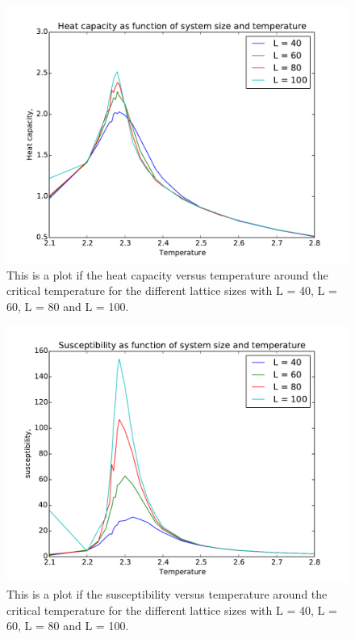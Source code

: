 \begin{figure}[H]
\includegraphics[width=\linewidth]{../results/4e/4e_Cv}\caption{This is a plot if the heat capacity versus temperature around the critical temperature for the different lattice sizes with L = 40, L = 60, L = 80 and L = 100.}\label{fig:4e_heat_capa}
\end{figure}

\begin{figure}[H]
\includegraphics[width=\linewidth]{../results/4e/4e_x}\caption{This is a plot if the susceptibility versus temperature around the critical temperature for the different lattice sizes with L = 40, L = 60, L = 80 and L = 100.}\label{fig:4e_suscept}
\end{figure}

